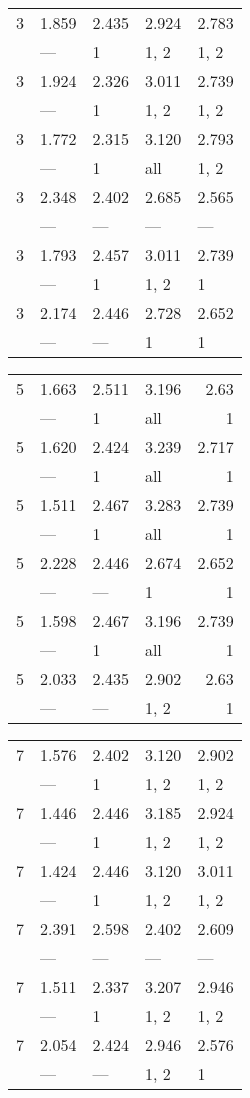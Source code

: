 \begin{tabular}{lllll}
\toprule
 3 & 1.859 & 2.435 & 2.924 & 2.783 \\
   & ---   & 1     & 1, 2  & 1, 2  \\
 3 & 1.924 & 2.326 & 3.011 & 2.739 \\
   & ---   & 1     & 1, 2  & 1, 2  \\
 3 & 1.772 & 2.315 & 3.120 & 2.793 \\
   & ---   & 1     & all   & 1, 2  \\
 3 & 2.348 & 2.402 & 2.685 & 2.565 \\
   & ---   & ---   & ---   & ---   \\
 3 & 1.793 & 2.457 & 3.011 & 2.739 \\
   & ---   & 1     & 1, 2  & 1     \\
 3 & 2.174 & 2.446 & 2.728 & 2.652 \\
   & ---   & ---   & 1     & 1     \\
\bottomrule
\end{tabular}
\begin{tabular}{llllr}
\toprule
 5 & 1.663 & 2.511 & 3.196 & 2.63  \\
   & ---   & 1     & all   & 1     \\
 5 & 1.620 & 2.424 & 3.239 & 2.717 \\
   & ---   & 1     & all   & 1     \\
 5 & 1.511 & 2.467 & 3.283 & 2.739 \\
   & ---   & 1     & all   & 1     \\
 5 & 2.228 & 2.446 & 2.674 & 2.652 \\
   & ---   & ---   & 1     & 1     \\
 5 & 1.598 & 2.467 & 3.196 & 2.739 \\
   & ---   & 1     & all   & 1     \\
 5 & 2.033 & 2.435 & 2.902 & 2.63  \\
   & ---   & ---   & 1, 2  & 1     \\
\bottomrule
\end{tabular}
\begin{tabular}{lllll}
\toprule
 7 & 1.576 & 2.402 & 3.120 & 2.902 \\
   & ---   & 1     & 1, 2  & 1, 2  \\
 7 & 1.446 & 2.446 & 3.185 & 2.924 \\
   & ---   & 1     & 1, 2  & 1, 2  \\
 7 & 1.424 & 2.446 & 3.120 & 3.011 \\
   & ---   & 1     & 1, 2  & 1, 2  \\
 7 & 2.391 & 2.598 & 2.402 & 2.609 \\
   & ---   & ---   & ---   & ---   \\
 7 & 1.511 & 2.337 & 3.207 & 2.946 \\
   & ---   & 1     & 1, 2  & 1, 2  \\
 7 & 2.054 & 2.424 & 2.946 & 2.576 \\
   & ---   & ---   & 1, 2  & 1     \\
\bottomrule
\end{tabular}

